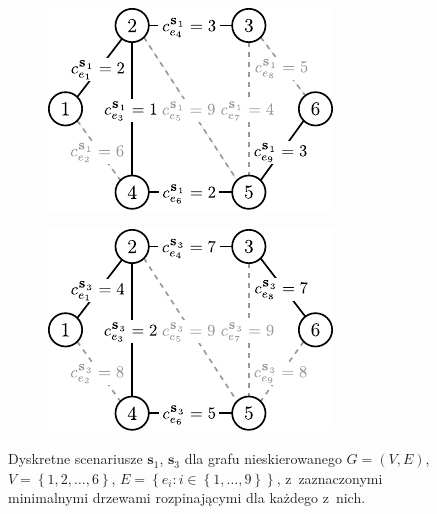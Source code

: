 \begin{figure}[!htbp]
	\null\hfill
	\begin{subfigure}[b]{0.35\textwidth}
		\includegraphics[width=\textwidth]{Chapter_II/MIN-MAX-DESC-example/a}
		\caption{}
		\label{fig:minmaxdesc:a}
	\end{subfigure}
	\hfill
	\begin{subfigure}[b]{0.35\textwidth}
		\includegraphics[width=\textwidth]{Chapter_II/MIN-MAX-DESC-example/b}
		\caption{}
		\label{fig:minmaxdesc:b}
	\end{subfigure}
	\hfill\null
	\caption{
		Dyskretne scenariusze $\textbf{s}_{1}$, $\textbf{s}_{3}$ dla grafu nieskierowanego $G = \left( V, E \right)$, $V = \left\{ 1, 2, \dots, 6 \right\}$, $E = \left\{ e_{i} : i \in \left\{ 1, \dots, 9 \right\} \right\}$, z~zaznaczonymi minimalnymi drzewami rozpinającymi dla każdego z~nich.
	}
	\label{fig:minmaxdesc}
\end{figure}

